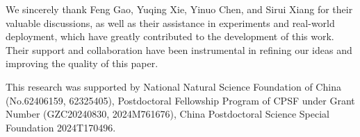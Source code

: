 We sincerely thank Feng Gao, Yuqing Xie, Yinuo Chen, and Sirui Xiang for their valuable discussions, as well as their assistance in experiments and real-world deployment, which have greatly contributed to the development of this work. Their support and collaboration have been instrumental in refining our ideas and improving the quality of this paper.

This research was supported by National Natural Science Foundation of China (No.62406159, 62325405), Postdoctoral Fellowship Program of CPSF under Grant Number (GZC20240830, 2024M761676), China Postdoctoral Science Special Foundation 2024T170496.